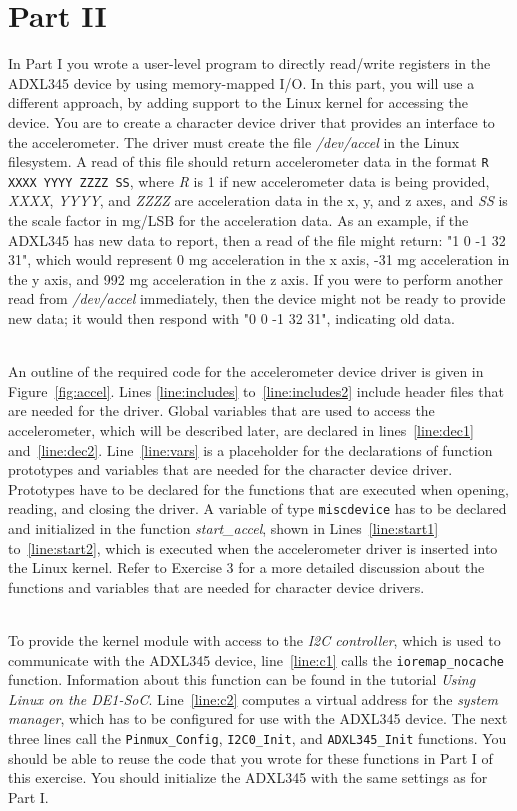 \documentclass[epsfig,10pt,fullpage]{article}
\begin{document}
\noindent
\section*{Part II}

\noindent
In Part I you wrote a user-level program to directly read/write registers in the ADXL345
device by using memory-mapped I/O. In this part, you will use a different approach, by
adding support to the Linux kernel for accessing the device.
You are to create a character device driver
that provides an interface to the accelerometer. The driver must create
the file {\it /dev/accel} in the Linux filesystem. A read of this file should return accelerometer
data in the format \texttt{R XXXX YYYY ZZZZ SS}, where {\it R} is 1 if new accelerometer data
is being provided, {\it XXXX}, {\it YYYY}, and {\it ZZZZ} are acceleration data in the 
x, y, and z axes, and {\it SS} is the scale factor in mg/LSB for the acceleration data. As
an example, if the ADXL345 has new data to report, then a read of the file might return:
"1 0 -1 32 31", which would represent 0 mg acceleration in the x axis, -31 mg acceleration in
the y axis, and 992 mg acceleration in the z axis. If you were to perform another read from {\it
/dev/accel} immediately, then the device might not be ready to provide new data; it would
then respond with "0 0 -1 32 31", indicating old data.

~\\
\noindent
An outline of the required code for the accelerometer device driver is given in 
Figure~\ref{fig:accel}. Lines \ref{line:includes} to~\ref{line:includes2} include header files
that are needed for the driver. Global variables that are used to access the accelerometer,
which will be described later, are declared in lines~\ref{line:dec1} and~\ref{line:dec2}.
Line~\ref{line:vars} is a placeholder for the declarations of function prototypes and variables
that are needed for the character device driver. Prototypes have to be declared for the functions
that are executed when opening, reading, and closing the driver. A variable of type 
\texttt{miscdevice} has to be declared and initialized in
the function {\it start\_accel}, shown in Lines~\ref{line:start1} to~\ref{line:start2},
which is executed when the accelerometer driver is inserted into the Linux kernel. Refer to
Exercise 3 for a more detailed discussion about the functions and variables that are needed for
character device drivers.

~\\
\noindent
To provide the kernel module with access to the {\it I2C controller}, which is used to
communicate with the ADXL345 device, line~\ref{line:c1} calls the \texttt{ioremap\_nocache}
function. Information about this function can be found in the tutorial {\it Using Linux on
the DE1-SoC}. Line~\ref{line:c2} computes a virtual address for the {\it system manager}, 
which has to be configured for use with the ADXL345 device. The next three lines call the
\texttt{Pinmux\_Config}, \texttt{I2C0\_Init}, and \texttt{ADXL345\_Init} functions. You
should be able to reuse the code that you wrote for these functions in Part I of this exercise.
You should initialize the ADXL345 with the same settings as for Part I.
\end{document}
